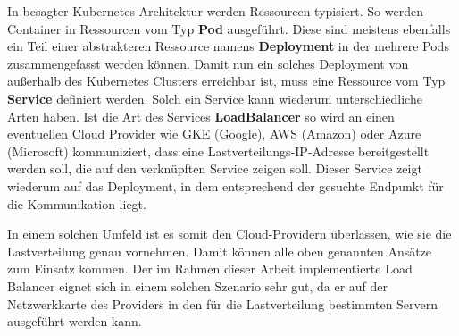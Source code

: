 In besagter Kubernetes-Architektur werden Ressourcen typisiert. So werden Container in Ressourcen vom Typ \textbf{Pod} ausgeführt. Diese sind meistens ebenfalls ein Teil einer abstrakteren Ressource namens \textbf{Deployment} in der mehrere Pods zusammengefasst werden können. Damit nun ein solches Deployment von außerhalb des Kubernetes Clusters erreichbar ist, muss eine Ressource vom Typ \textbf{Service} definiert werden. Solch ein Service kann wiederum unterschiedliche Arten haben. Ist die Art des Services \textbf{LoadBalancer} so wird an einen eventuellen Cloud Provider wie GKE (Google), AWS (Amazon) oder Azure (Microsoft) kommuniziert, dass eine Lastverteilungs-IP-Adresse bereitgestellt werden soll, die auf den verknüpften Service zeigen soll. Dieser Service zeigt wiederum auf das Deployment, in dem entsprechend der gesuchte Endpunkt für die Kommunikation liegt. 

In einem solchen Umfeld ist es somit den Cloud-Providern überlassen, wie sie die Lastverteilung genau vornehmen. Damit können alle oben genannten Ansätze zum Einsatz kommen. Der im Rahmen dieser Arbeit implementierte Load Balancer eignet sich in einem solchen Szenario sehr gut, da er auf der Netzwerkkarte des Providers in den für die Lastverteilung bestimmten Servern ausgeführt werden kann.